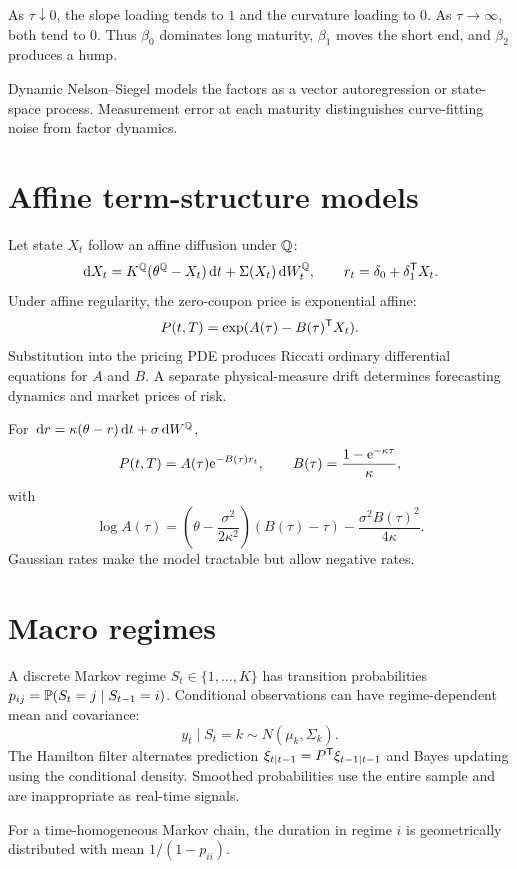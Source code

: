 \begin{example}
As $\tau\downarrow0$, the slope loading tends to $1$ and the curvature loading to
$0$. As $\tau\to\infty$, both tend to $0$. Thus $\beta_0$ dominates long maturity,
$\beta_1$ moves the short end, and $\beta_2$ produces a hump.
\end{example}

Dynamic Nelson--Siegel models the factors as a vector autoregression or state-space
process. Measurement error at each maturity distinguishes curve-fitting noise from
factor dynamics.

\section{Affine term-structure models}

Let state $X_t$ follow an affine diffusion under $\mathbb Q$:
\[
\,\mathrm d X_t=K^\mathbb Q(\theta^\mathbb Q-X_t)\,\mathrm d t+\Sigma(X_t)\,\mathrm d W_t^\mathbb Q,
\qquad r_t=\delta_0+\delta_1^\mathsf T X_t.
\]
Under affine regularity, the zero-coupon price is exponential affine:
\[
P(t,T)=\exp(A(\tau)-B(\tau)^\mathsf T X_t).
\]
Substitution into the pricing PDE produces Riccati ordinary differential equations
for $A$ and $B$. A separate physical-measure drift determines forecasting dynamics
and market prices of risk.

\begin{example}
For $\,\mathrm d r=\kappa(\theta-r)\,\mathrm d t+\sigma\,\mathrm d W^\mathbb Q$,
\[
P(t,T)=A(\tau)\mathrm e^{-B(\tau)r_t},\qquad
B(\tau)=\frac{1-\mathrm e^{-\kappa\tau}}{\kappa},
\]
with
\[
\log A(\tau)=
\left(\theta-\frac{\sigma^2}{2\kappa^2}\right)(B(\tau)-\tau)
-\frac{\sigma^2B(\tau)^2}{4\kappa}.
\]
Gaussian rates make the model tractable but allow negative rates.
\end{example}

\section{Macro regimes}

A discrete Markov regime $S_t\in\{1,\ldots,K\}$ has transition probabilities
$p_{ij}=\mathbb P(S_t=j\mid S_{t-1}=i)$. Conditional observations can have
regime-dependent mean and covariance:
\[
y_t\mid S_t=k\sim N(\mu_k,\Sigma_k).
\]
The Hamilton filter alternates prediction
$\xi_{t|t-1}=P^\mathsf T\xi_{t-1|t-1}$ and Bayes updating using the conditional
density. Smoothed probabilities use the entire sample and are inappropriate as
real-time signals.

\begin{definition}
For a time-homogeneous Markov chain, the duration in regime $i$ is geometrically
distributed with mean $1/(1-p_{ii})$.
\end{definition}

